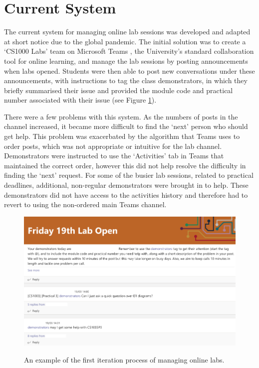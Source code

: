 \section{Current System}

The current system for managing online lab sessions was developed and adapted at short notice due to the global pandemic. The initial solution was to create a `CS1000 Labs' team on Microsoft Teams \cite{teams}, the University's standard collaboration tool for online learning, and manage the lab sessions by posting announcements when labs opened. Students were then able to post new conversations under these announcements, with instructions to tag the class demonstrators, in which they briefly summarised their issue and provided the module code and practical number associated with their issue (see Figure \ref{fig:firstit}).

There were a few problems with this system. As the numbers of posts in the channel increased, it became more difficult to find the `next' person who should get help. This problem was exacerbated by the algorithm that Teams uses to order posts, which was not appropriate or intuitive for the lab channel. Demonstrators were instructed to use the `Activities' tab in Teams that maintained the correct order, however this did not help resolve the difficulty in finding the `next' request. For some of the busier lab sessions, related to practical deadlines, additional, non-regular demonstrators were brought in to help. These demonstrators did not have access to the activities history and therefore had to revert to using the non-ordered main Teams channel.

\FloatBarrier
\begin{figure}[H]
  \centering
  \includegraphics[width=\textwidth]{2context/images/teams1.png}
  \label{fig:firstit}
  \caption{An example of the first iteration process of managing online labs.}
\end{figure}


